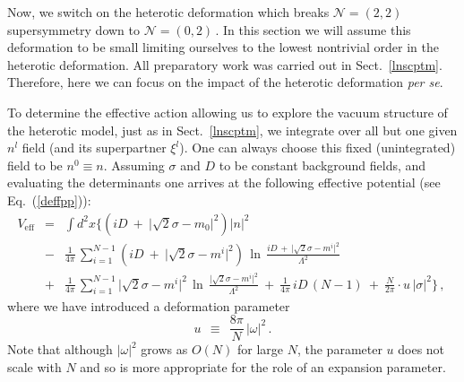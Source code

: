 \documentclass[epsfig,12pt]{article}
\def\beq{\begin{equation}}
\def\eeq{\end{equation}}
\def\beqn{\begin{eqnarray}}
\def\eeqn{\end{eqnarray}}
\newcommand{\ntt}{${\mathcal N}=(2,2)\,$}
\newcommand{\nzt}{${\mathcal N}=(0,2)\,$}
\def\beqn{\begin{eqnarray}}
\def\eeqn{\end{eqnarray}}
\def\beq{\begin{equation}}
\def\eeq{\end{equation}}
\begin{document}
{Now, we switch on the heterotic deformation which breaks \ntt\, supersymmetry down to \nzt\!.
In this section we will assume this deformation to be small limiting ourselves to the lowest
nontrivial order in the heterotic deformation. All preparatory work was carried out in Sect.~\ref{lnscptm}.
Therefore, here we can focus on the impact of the heterotic deformation {\em per se}.

To determine the effective action allowing us to explore the vacuum structure of the
heterotic
model, just as in Sect.~\ref{lnscptm}, we integrate over all but one given $ n^l $ field (and its superpartner $ \xi^l $).
One can always choose this fixed (unintegrated) field to be   $n^0\equiv n$.
Assuming $\sigma$ and $D$ to be constant background fields,
and  evaluating the determinants
one arrives at the following effective potential (see Eq.~(\ref{deffpp})):
\beqn
	V_\text{eff} & =& \int d^2x 
		\biggl\{  \left( iD ~+~ \bigl|\sqrt{2}\sigma -  m_0 \bigr|^2 \right) |n|^2 
	\nonumber\\[4mm]
	&-& 
	\frac{1}{4\pi}\, \sum_{i=1}^{N-1} \left( iD ~+~ \bigl|\sqrt{2}\sigma -  m^i \bigr|^2 \right)\,
		\ln\, \frac{ iD \,+\, \bigl| \sqrt{2}\sigma - m^i \bigr|^2} {\Lambda^2}
\label{Veff}
\\[4mm]
	&+&
	\frac{1}{4\pi}\, \sum_{i=1}^{N-1} \bigl|\sqrt{2}\sigma - m^i \bigr|^2\,
			\ln\, \frac{ \bigl| \sqrt{2}\sigma - m^i \bigr|^2 } { \Lambda^2 }
	~+~
	\frac{1}{4\pi}\, iD\, (N-1) 
	~+~
	\frac{N}{2\pi} \cdot u\, \bigl|\sigma\bigr|^2 \biggr\} \,,
	\nonumber\
\eeqn
where we have introduced a deformation parameter
 \beq
u ~~\equiv~~ \frac{8\pi}{N}\,|\omega|^2 \,.
\label{u}
\eeq	
Note that although $ |\omega|^2 $ grows as $ O(N) $ for large $N$, the parameter $u$ 
does not scale with $N$ and so is more appropriate for the r{o}le of an expansion parameter. 

}
\end{document}
